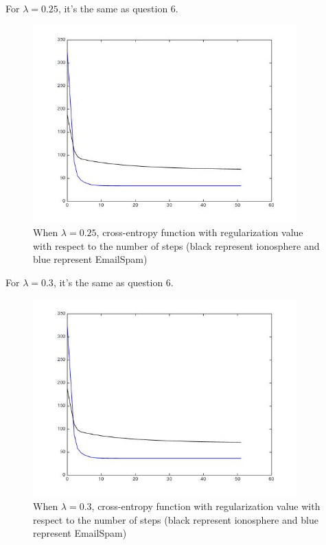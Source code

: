 \documentclass[11pt]{article}
\numberwithin{equation}{section}
\begin{document}
	For $\lambda = 0.25$, it's the same as question 6.
	\begin{figure} [H]
    	\centering 
    	\includegraphics[width=4in]{Q7025} 
    	\caption{When $\lambda = 0.25$, cross-entropy function with regularization value with respect to the number of steps (black represent ionosphere and blue represent EmailSpam)} 
    	\label{fig:side:a} 
	\end{figure}
	
	For $\lambda = 0.3$, it's the same as question 6.
	\begin{figure} [H]
    	\centering 
    	\includegraphics[width=4in]{Q703} 
    	\caption{When $\lambda = 0.3$, cross-entropy function with regularization value with respect to the number of steps (black represent ionosphere and blue represent EmailSpam)} 
    	\label{fig:side:a} 
	\end{figure}
	
\end{document}
